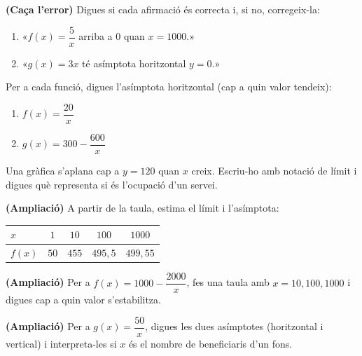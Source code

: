 \begin{exercicis}
\begin{exlist}
  \item \textbf{(Caça l'error)} Digues si cada afirmació és correcta i, si no, corregeix-la:
        \begin{enumerate}[label=\alph*), leftmargin=1.6em, topsep=2pt]
          \item «$f(x)=\dfrac{5}{x}$ arriba a $0$ quan $x=1000$.»
          \item «$g(x)=3x$ té asímptota horitzontal $y=0$.»
        \end{enumerate}
  \item Per a cada funció, digues l'asímptota horitzontal (cap a quin valor tendeix):
        \begin{enumerate}[label=\alph*), leftmargin=1.6em, topsep=2pt]
          \item $f(x)=\dfrac{20}{x}$ \hfill \item $g(x)=300-\dfrac{600}{x}$
        \end{enumerate}
  \item Una gràfica s'aplana cap a $y=120$ quan $x$ creix. Escriu-ho amb notació de
        límit i digues què representa si és l'ocupació d'un servei.
  \item \textbf{(Ampliació)} A partir de la taula, estima el límit i l'asímptota:
        \begin{center}
        \begin{tabular}{lcccc}
        \toprule
        $x$ & $1$ & $10$ & $100$ & $\num{1000}$ \\
        \midrule
        $f(x)$ & $50$ & $455$ & $495,5$ & $499,55$ \\
        \bottomrule
        \end{tabular}
        \end{center}
  \item \textbf{(Ampliació)} Per a $f(x)=1000-\dfrac{2000}{x}$, fes una taula amb
        $x=10,100,1000$ i digues cap a quin valor s'estabilitza.
  \item \textbf{(Ampliació)} Per a $g(x)=\dfrac{50}{x}$, digues les dues asímptotes
        (horitzontal i vertical) i interpreta-les si $x$ és el nombre de beneficiaris
        d'un fons.
\end{exlist}
\end{exercicis}

